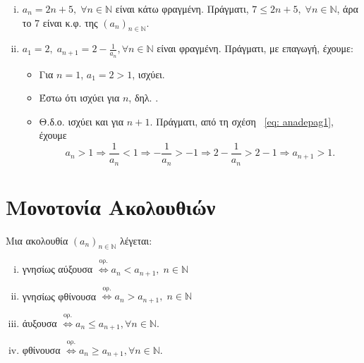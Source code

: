 \documentclass[main.tex]{subfiles}
\begin{document}
\begin{examples}
\begin{enumerate}[i)]
        \item $ a_{n}= 2n+5, \; \forall n \in \mathbb{N} $ είναι κάτω 
            φραγμένη.
            Πράγματι, $ 7 \leq 2n+5, \; \forall n \in \mathbb{N} $, άρα το 
            7 είναι κ.φ. της $ (a_{n} )_{n \in \mathbb{N}} $.

        \item $ a_{1}=2, \; a_{n+1}=2 - \frac{1}{a_{n}}, \forall n \in 
            \mathbb{N}$
            είναι φραγμένη. Πράγματι, με επαγωγή, έχουμε:
            \begin{itemize}
                \item Για $ n=1 $, $ a_{1}=2>1 $, ισχύει. 
                \item Έστω ότι ισχύει για $n$, δηλ. .
                \item Θ.δ.ο. ισχύει και για $ n+1 $. Πράγματι, από τη σχέση~
                    \eqref{eq: anadepag1}, έχουμε
                    \[
                        a_{n}>1 \Rightarrow \frac{1}{a_{n}} 
                        < 1 \Rightarrow - \frac{1}{a_{n}} > 
                        -1 \Rightarrow 2 - \frac{1}{a_{n}} 
                        > 2-1 \Rightarrow a_{n+1} > 1.
                    \] 
            \end{itemize}
    \end{enumerate}
\end{examples}

\section{Μονοτονία Ακολουθιών}

\begin{dfn}
    Μια ακολουθία $ (a_{n})_{n \in \mathbb{N}} $ λέγεται:
    \begin{enumerate}[i)]
        \item γνησίως αύξουσα $ \overset{\text{ορ.}}{\Leftrightarrow} a_{n} 
            < a_{n+1}, \; n \in \mathbb{N}$
        \item γνησίως φθίνουσα $ \overset{\text{ορ.}}{\Leftrightarrow} a_{n} 
            > a_{n+1}, \; n \in \mathbb{N}$
        \item άυξουσα $ \overset{\text{ορ.}}{\Leftrightarrow} a_{n} \leq 
            a_{n+1}, \forall n \in \mathbb{N}  $.
        \item φθίνουσα $ \overset{\text{ορ.}}{\Leftrightarrow} a_{n} \geq 
            a_{n+1}, \forall n \in \mathbb{N}  $.
    \end{enumerate}
\end{dfn}
\end{document}
